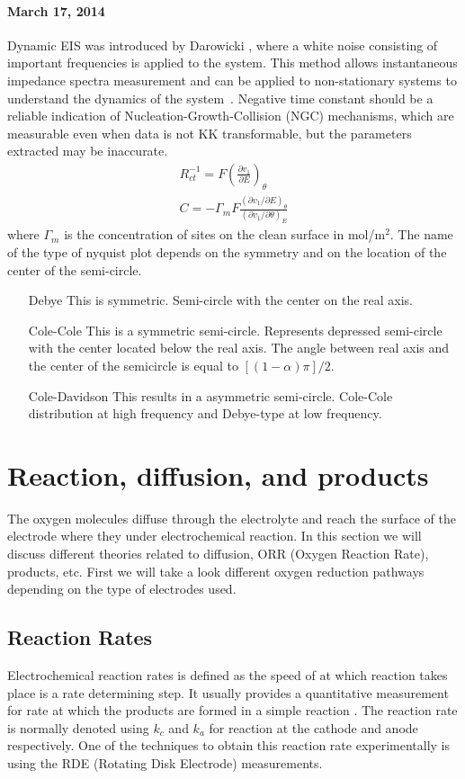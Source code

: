 \documentclass[12pt]{book}
\begin{document}
\paragraph{March 17, 2014}
Dynamic EIS was introduced by Darowicki \cite{Darowicki2000}, where a white noise consisting of important frequencies is applied to the system. This method allows instantaneous impedance spectra measurement and can be applied to non-stationary systems to understand the dynamics of the system~\cite{Darowicki2005}. Negative time constant should be a reliable indication of Nucleation-Growth-Collision (NGC) mechanisms, which are measurable even when data is not KK transformable, but the parameters extracted may be inaccurate. 
\begin{align}
R_{ct}^{-1}=F\left(\frac{\partial v_1}{\partial E}\right)_\theta\\
C=-\Gamma_mF\frac{\left(\partial v_1/\partial E\right)_\theta}{\left(\partial v_1/\partial\theta\right)_E}
\end{align}
where $\Gamma_m$ is the concentration of sites on the clean surface in mol/m$^2$.
The name of the type of nyquist plot depends on the symmetry and on the location of the center of the semi-circle.
\begin{enumerate}
\item[Debye] This is symmetric. Semi-circle with the center on the real axis.
\item[Cole-Cole] This is a symmetric semi-circle. Represents depressed semi-circle with the center located below the real axis.  The angle between real axis and the center of the semicircle is equal to $[(1-\alpha)\pi]/2$.
\item[Cole-Davidson] This results in a asymmetric semi-circle. Cole-Cole distribution at high frequency and Debye-type at low frequency.
\end{enumerate}

\section{Reaction, diffusion, and products }
The oxygen molecules diffuse through the electrolyte and reach the surface of the electrode where they under electrochemical reaction.
In this section we will discuss different theories related to diffusion, ORR (Oxygen Reaction Rate), products, etc.
First we will take a look different oxygen reduction pathways depending on the type of electrodes used.

\subsection{Reaction Rates}
Electrochemical reaction rates is defined as the speed of at which reaction takes place is a rate determining step. It usually provides a quantitative measurement for rate at which the products are formed in a simple reaction . The reaction rate is normally denoted using $k_c$ and $k_a$ for reaction at the cathode and anode respectively. One of the techniques to obtain this reaction rate experimentally is using the RDE (Rotating Disk Electrode) measurements.
 
\end{document}
